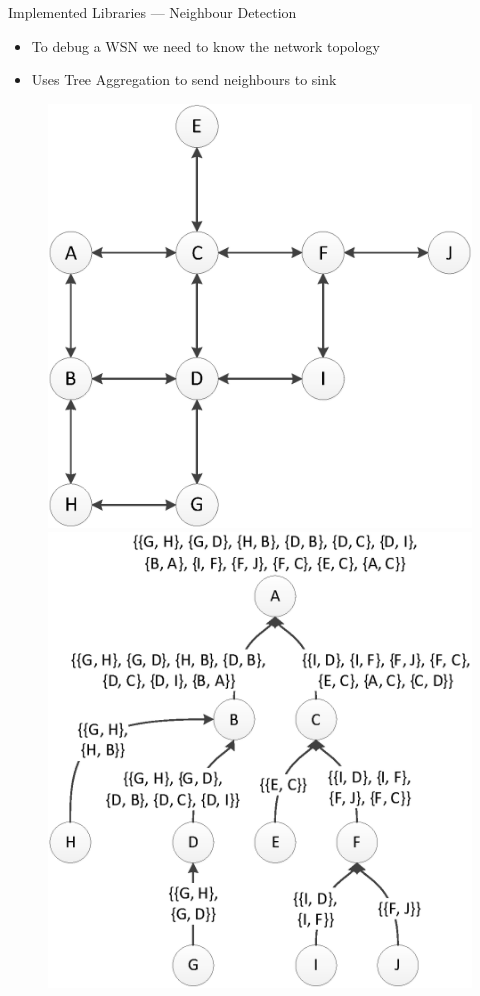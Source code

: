 \documentclass[usenames,dvipsnames]{beamer}
\begin{document}
\begin{frame}{Implemented Libraries --- Neighbour Detection}
	\begin{itemize}
		\item To debug a WSN we need to know the network topology
		\item Uses Tree Aggregation to send neighbours to sink
	\end{itemize}

\begin{figure}[H]
\includegraphics[scale=0.35]{../Report/Diagrams/neighbour-network.eps}\hspace{1em}
\includegraphics[scale=0.35]{../Report/Diagrams/neighbour-tree-structure.eps}
\end{figure}
\end{frame}
\end{document}
